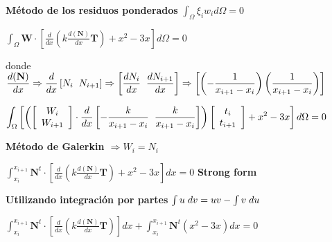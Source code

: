 \documentclass[12pt]{report}
\begin{document}
        \textbf{Método de los residuos ponderados} $\int_{\Omega} \xi_i w_i d\Omega = 0$       
        \begin{center}
            $\displaystyle \int_{\Omega} \textbf{W} \cdot \left[\frac{d}{dx} \left( k\frac{d(\textbf{N})}{dx} \textbf{T}\right) + x^2 -3x  \right] d\Omega = 0$   
        \end{center}

        donde $\displaystyle \frac{d(\textbf{N})}{dx} \Rightarrow \frac{d}{dx} \left[ N_i \hspace{0.2cm} N_{i+1}\right] \Rightarrow  \left[ \frac{d N_i}{dx} \hspace{0.2cm} \frac{d N_{i+1}}{dx}\right] \Rightarrow \left[ \left( -\frac{1}{x_{i+1}-x_i} \right) \left( \frac{1}{x_{i+1}-x_i} \right) \right]$

        \begin{center}
            $\displaystyle \int_\Omega \left[ \left(
                \left[ \begin{array}{c} W_{i} \\ W_{i+1} \end{array} \right]
                \cdot \frac{d}{dx} 
                \left[ -\frac{k}{x_{i+1}-x_i} \hspace{0.2cm} \frac{k}{x_{i+1}-x_i} \right]
            \right) \left[ \begin{array}{c} t_{i} \\ t_{i+1} \end{array}\right]+ x^2 -3x \right] d\Omega= 0$
        \end{center}

        \textbf{Método de Galerkin $\Rightarrow W_i = N_i$}
        \begin{center}
            $\displaystyle \int_{x_i}^{x_{i+1}} \textbf{N}^t \cdot \left[\frac{d}{dx} \left( k\frac{d(\textbf{N})}{dx} \textbf{T}\right) + x^2 -3x  \right] dx = 0$  \hspace{1cm} \textbf{Strong form} 
        \end{center}

        \textbf{Utilizando integración por partes } $\int u \hspace{0.1cm} dv = uv- \int v \hspace{0.1cm} du$
        \begin{center}
            $\displaystyle \int_{x_i}^{x_{i+1}} \textbf{N}^t \cdot \left[\frac{d}{dx} \left( k\frac{d(\textbf{N})}{dx} \textbf{T}\right) \right] dx +    \int_{x_i}^{x_{i+1}} \textbf{N}^t (x^2 -3x) dx = 0$ 
        \end{center}
\end{document}
